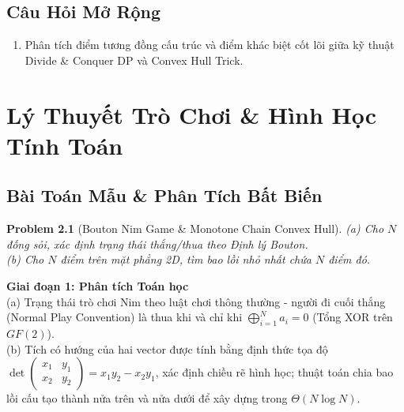 \documentclass[11pt, letterpaper]{report}
\newtheorem{baitoan}{Problem}[chapter]
\begin{document}
\section{Câu Hỏi Mở Rộng}
\begin{enumerate}
 \item Phân tích điểm tương đồng cấu trúc và điểm khác biệt cốt lõi giữa kỹ thuật Divide \& Conquer DP và Convex Hull Trick.
\end{enumerate}

\chapter{Lý Thuyết Trò Chơi \& Hình Học Tính Toán}
\label{mod:games_geometry}

\section{Bài Toán Mẫu \& Phân Tích Bất Biến}
\begin{baitoan}[Bouton Nim Game \& Monotone Chain Convex Hull]
(a) Cho $N$ đống sỏi, xác định trạng thái thắng/thua theo Định lý Bouton.\\
(b) Cho $N$ điểm trên mặt phẳng 2D, tìm bao lồi nhỏ nhất chứa $N$ điểm đó.
\end{baitoan}

\noindent\textbf{Giai đoạn 1: Phân tích Toán học}\\
(a) Trạng thái trò chơi Nim theo luật chơi thông thường - người đi cuối thắng (Normal Play Convention) là thua khi và chỉ khi $\bigoplus_{i=1}^N a_i = 0$ (Tổng XOR trên $GF(2)$).\\
(b) Tích có hướng của hai vector được tính bằng định thức tọa độ $\det \begin{pmatrix} x_1 & y_1 \\ x_2 & y_2 \end{pmatrix} = x_1 y_2 - x_2 y_1$, xác định chiều rẽ hình học; thuật toán chia bao lồi cấu tạo thành nửa trên và nửa dưới để xây dựng trong $\Theta(N \log N)$.
\end{document}
